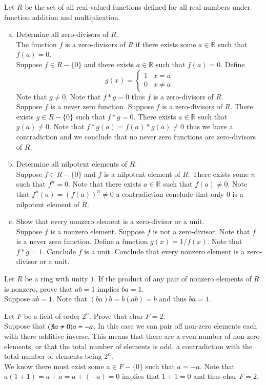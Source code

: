\documentclass[12pt]{article}
\makeatletter
\theoremstyle{homework}
\newenvironment{exercise}[1]
{\def\@currentlabel{#1}\exercisecore}
{\endexercisecore}
\makeatother
\begin{document}
\begin{exercise}{13.28}
Let $R$ be the set of all real-valued functions defined for all real numbers under function addition and multiplication.
\begin{enumerate}[a)]
\item
Determine all zero-divisors of $R$.\\
The function $f$ is a zero-divisors of $R$ if there exists some $a\in \mathbb{R}$ such that $f(a)=0$.\\
Suppose $f\in R-\{0\}$ and there exists $a\in \mathbb{R}$ such that $f(a)=0$.  Define $$g(x)=\begin{cases} 1 & x=a\\ 0 & x\neq a \end{cases}$$  Note that $g\neq 0$.  Note that $f*g=0$ thus $f$ is a zero-divisors of $R$.\\
Suppose $f$ is a never zero function.  Suppose $f$ is a zero-divisors of $R$.  There exists $g\in R-\{0\}$ such that $f*g=0$.  There exists $a\in \mathbb{R}$ such that $g(a)\neq 0$.  Note that $f*g(a)=f(a)*g(a)\neq 0$ thus we have a contradiction and we conclude that no never zero functions are zero-divisors of $R$.
\item
Determine all nilpotent elements of $R$.\\
Suppose $f\in R-\{0\}$ and $f$ is a nilpotent element of $R$.  There exists some $n$ such that $f^n=0$.  Note that there exists $a\in\mathbb{R}$ such that $f(a)\neq 0$.  Note that $f^n(a)=(f(a))^n\neq 0$ a contradiction conclude that only $0$ is a nilpotent element of $R$.
\item
Show that every nonzero element is a zero-divisor or a unit.\\
Suppose $f$ is a nonzero element.  Suppose $f$ is not a zero-divisor.  Note that $f$ is a never zero function.  Define a function $g(x)=1/f(x)$.  Note that $f*g=1$.  Conclude $f$ is a unit.  Conclude that every nonzero element is a zero-divisor or a unit.
\end{enumerate}
\end{exercise}

\begin{exercise}{13.31}
Let $R$ be a ring with unity $1$. If the product of any pair of nonzero elements of $R$ is nonzero, prove that $ab = 1$ implies $ba = 1$.\\
Suppose $ab = 1$.  Note that $(ba)b=b(ab)=b$ and thus $ba=1$.
\end{exercise}

\begin{exercise}{13.35}
Let $F$ be a field of order $2^n$. Prove that $\text{char } F = 2$.\\
Suppose that $(\not\exists a\neq 0) a=-a$.  In this case we can pair off non-zero elements each with there additive inverse.  This means that there are a even number of non-zero elements, or that the total number of elements is odd, a contradiction with the total number of elements being $2^n$.\\
We know there must exist some $a\in F-\{0\}$ such that $a=-a$.  Note that $a(1+1)=a+a=a+(-a)=0$ implies that $1+1=0$ and thus $\text{char } F = 2$.
\end{exercise}
\end{document}
